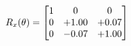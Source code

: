 \documentclass[preview]{standalone}
\begin{document}
\begin{align*}
\special{dvisvgm:raw <g id='unique000'>}R_{x}(\theta) = \begin{bmatrix}1 & 0 & 0 \\0 & +1.00 & +0.07 \\0 & -0.07 & +1.00\end{bmatrix}\special{dvisvgm:raw </g>}
\end{align*}
\end{document}
